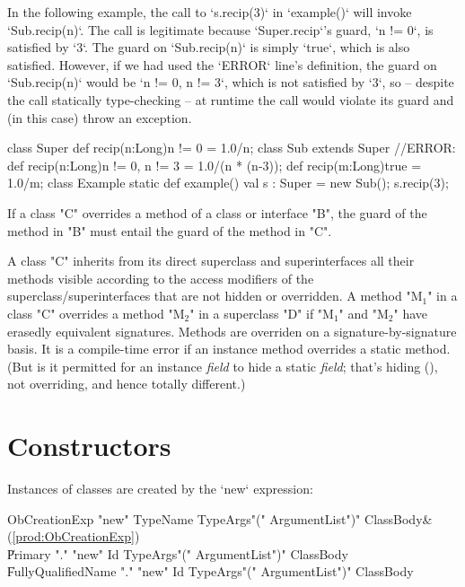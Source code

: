 \begin{ex}
In the following example, the call to \xcd`s.recip(3)` in \xcd`example()`
will invoke \xcd`Sub.recip(n)`.  The call is legitimate because
\xcd`Super.recip`'s guard, \xcd`n != 0`, is satisfied by \xcd`3`.  
The guard on \xcd`Sub.recip(n)` is simply
\xcd`true`, which is also satisfied.  However, if we had used the \xcd`ERROR`
line's definition, the guard on \xcd`Sub.recip(n)` would be \xcd`n != 0, n != 3`, which
is not satisfied by \xcd`3`, so -- despite the call statically type-checking
-- at runtime the call would violate its guard and (in this case) throw an exception.
\begin{xten}
class Super {
  def recip(n:Long){n != 0} = 1.0/n;
}
class Sub extends Super{
  //ERROR: def recip(n:Long){n != 0, n != 3} = 1.0/(n * (n-3));
  def recip(m:Long){true} = 1.0/m;
}
class Example{
  static def example() {
     val s : Super = new Sub();
     s.recip(3);
  }
}
\end{xten}
%

\end{ex}


  If a class \xcd"C" overrides a method of a class or interface
  \xcd"B", the guard of the method in \xcd"B" must entail
  the guard of the method in \xcd"C".


A class \xcd"C" inherits from its direct superclass and superinterfaces all
their methods visible according to the access modifiers
of the superclass/superinterfaces that are not hidden or overridden. A method \xcdmath"M$_1$" in a class
\xcd"C" overrides
a method \xcdmath"M$_2$" in a superclass \xcd"D" if
\xcdmath"M$_1$" and \xcdmath"M$_2$" have erasedly equivalent signatures.
Methods are overriden on a signature-by-signature basis.  It is a compile-time
error if an instance method overrides a static method.  (But is it permitted
for an instance {\em field} to hide a static {\em field}; that's hiding
(), not 
overriding, and hence totally different.)

\section{Constructors}
\label{sect:constructors}

Instances of classes are created by the \xcd`new` expression: \\
\begin{bbgrammar}
       ObCreationExp \: \xcd"new" TypeName TypeArgs\opt \xcd"(" ArgumentList\opt \xcd")" ClassBody\opt & (\ref{prod:ObCreationExp}) \\
                     \| Primary \xcd"." \xcd"new" Id TypeArgs\opt \xcd"(" ArgumentList\opt \xcd")" ClassBody\opt \\
                     \| FullyQualifiedName \xcd"." \xcd"new" Id TypeArgs\opt \xcd"(" ArgumentList\opt \xcd")" ClassBody\opt \\
\end{bbgrammar}

